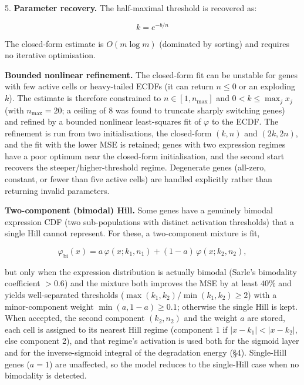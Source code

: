 \documentclass[11pt]{article}
\begin{document}
5. \textbf{Parameter recovery.} The half-maximal threshold is recovered as:

\begin{equation}
k = e^{-b/n} 
\end{equation}


The closed-form estimate is $O(m \log m)$ (dominated by sorting) and requires no iterative optimisation.

\textbf{Bounded nonlinear refinement.} The closed-form fit can be unstable for genes with few active cells or heavy-tailed ECDFs (it can return $n \le 0$ or an exploding $k$). The estimate is therefore constrained to $n \in [1, n_{\max}]$ and $0 < k \le \max_j x_j$ (with $n_{\max}=20$; a ceiling of $8$ was found to truncate sharply switching genes) and refined by a bounded nonlinear least-squares fit of $\varphi$ to the ECDF. The refinement is run from two initialisations, the closed-form $(k,n)$ and $(2k, 2n)$, and the fit with the lower MSE is retained; genes with two expression regimes have a poor optimum near the closed-form initialisation, and the second start recovers the steeper/higher-threshold regime. Degenerate genes (all-zero, constant, or fewer than five active cells) are handled explicitly rather than returning invalid parameters.

\textbf{Two-component (bimodal) Hill.} Some genes have a genuinely bimodal expression CDF (two sub-populations with distinct activation thresholds) that a single Hill cannot represent. For these, a two-component mixture is fit,

\begin{equation}
\varphi_{\text{bi}}(x) = a\,\varphi(x; k_1, n_1) + (1-a)\,\varphi(x; k_2, n_2), 
\end{equation}

but only when the expression distribution is actually bimodal (Sarle's bimodality coefficient $> 0.6$) and the mixture both improves the MSE by at least $40\%$ and yields well-separated thresholds ($\max(k_1,k_2)/\min(k_1,k_2) \ge 2$) with a minor-component weight $\min(a, 1-a) \ge 0.1$; otherwise the single Hill is kept. When accepted, the second component $(k_2, n_2)$ and the weight $a$ are stored, each cell is assigned to its nearest Hill regime (component 1 if $|x-k_1| < |x-k_2|$, else component 2), and that regime's activation is used both for the sigmoid layer and for the inverse-sigmoid integral of the degradation energy (§4). Single-Hill genes ($a = 1$) are unaffected, so the model reduces to the single-Hill case when no bimodality is detected.
\end{document}
